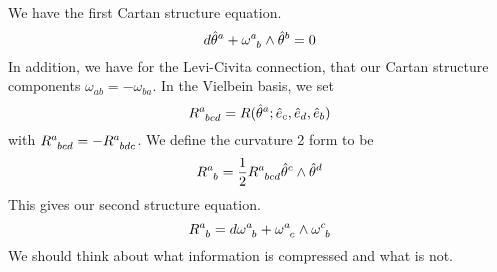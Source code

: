 We have the first Cartan structure equation. 
\[
 d \hat{ \theta } ^ a + \omega  \indices{ ^ a _ b } \wedge  \hat{ \theta } ^ b = 0  
\]
In addition, we have for the Levi-Civita connection, that 
our Cartan structure components $ \omega_{ ab } = - \omega _{ b a}$. 
In the Vielbein basis, we set 
\[
	R \indices{ ^ a _{ bcd } } = R ( \hat{ \theta } ^ a ; \hat{ e } _ c , \hat{ e } _ d , \hat{ e } _ b )  
\] with $ R \indices{ ^ a _{ b cd } }   = - R \indices{ ^ a _{ b d c } }  $. We 
define the curvature 2 form to be 
\[
 R \indices{ ^ a _ b } = \frac{1}{2 } R \indices{ ^ a _{ b cd  } } \hat{ \theta } ^ c 
 \wedge  \hat{ \theta } ^  d
\] This gives our second structure equation. 
\[
 R \indices{ ^ a _ b } = d \omega \indices{ ^ a _ b } + \omega \indices{ ^ a _ c } \wedge  \omega \indices{ ^ c _ b}    
\] We should think about what information is compressed and what is not.

